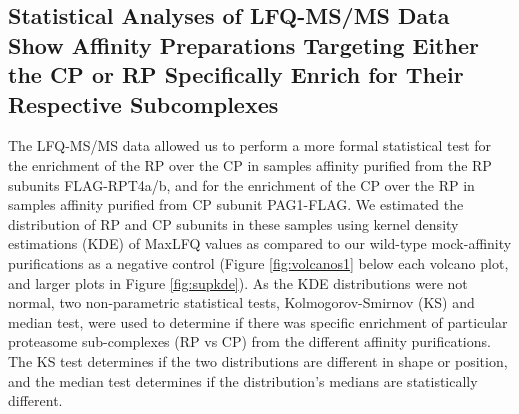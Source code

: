\subsection{Statistical Analyses of LFQ-MS/MS Data Show Affinity Preparations Targeting Either the CP or RP Specifically Enrich for Their Respective Subcomplexes}
The LFQ-MS/MS data allowed us to perform a more formal statistical test for the enrichment of the RP over the CP in samples affinity purified from the RP subunits FLAG-RPT4a/b, and for the enrichment of the CP over the RP in samples affinity purified from CP subunit PAG1-FLAG. We estimated the distribution of RP and CP subunits in these samples using kernel density estimations (KDE) of MaxLFQ values as compared to our wild-type mock-affinity purifications as a negative control (Figure \ref{fig:volcanos1} below each volcano plot, and larger plots in Figure \ref{fig:supkde}).  As the KDE distributions were not normal, two non-parametric statistical tests, Kolmogorov-Smirnov (KS) and median test, were used to determine if there was specific enrichment of particular proteasome sub-complexes (RP vs CP) from the different affinity purifications. The KS test determines if the two distributions are different in shape or position, and the median test determines if the distribution's medians are statistically different.

